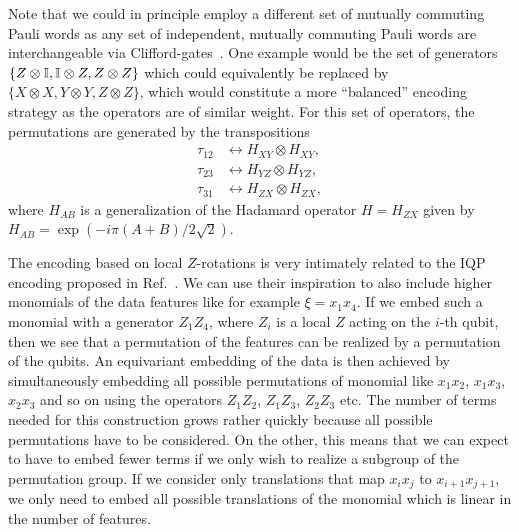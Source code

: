 \documentclass[a4paper,twocolumn,notitlepage,nofootinbib,superscriptaddress,floatfix]{revtex4-2}
\begin{document}
Note that we could in principle employ a different set of mutually commuting Pauli words as any set of independent, mutually commuting Pauli words are interchangeable via Clifford-gates~\cite{aaronson2004improved}. One example would be the set of generators $\{ Z \otimes \mathbb{I}, \mathbb{I} \otimes Z, Z \otimes Z\}$ which could equivalently be replaced by $\{ X \otimes X, Y \otimes Y, Z \otimes Z \}$, which would constitute a more \enquote{balanced} encoding strategy as the operators are of similar weight. For this set of operators, the permutations are generated by the transpositions
\begin{align}
    \tau_{12} &\leftrightarrow H_{XY} \otimes H_{XY}, \\
    \tau_{23} &\leftrightarrow H_{YZ} \otimes H_{YZ} ,\\
    \tau_{31} &\leftrightarrow H_{ZX} \otimes H_{ZX}, 
\end{align}
where $H_{AB}$ is a generalization of the Hadamard operator $H = H_{ZX}$ given by $H_{AB} = \exp(-i \pi  (A + B)/2\sqrt{2})$. 

The encoding based on local $Z$-rotations is very intimately related to the IQP encoding proposed in Ref.~\cite{havlicek2019supervised}. We can use their inspiration to also include higher monomials of the data features like for example $\xi = x_1 x_4$. If we embed such a monomial with a generator $Z_1 Z_4$, where $Z_i$ is a local $Z$ acting on the $i$-th qubit, then we see that a permutation of the features can be realized by a permutation of the qubits. An equivariant embedding of the data is then achieved by simultaneously embedding all possible permutations of monomial like $x_1 x_2$, $x_1 x_3$, $x_2 x_3$ and so on using the operators $Z_1 Z_2$, $Z_1 Z_3$, $Z_2 Z_3$ etc. The number of terms needed for this construction grows rather quickly because all possible permutations have to be considered. On the other, this means that we can expect to have to embed fewer terms if we only wish to realize a subgroup of the permutation group. If we consider only translations that map $x_i x_j$ to $x_{i+1} x_{j+1}$, we only need to embed all possible translations of the monomial which is linear in the number of features.
\end{document}
